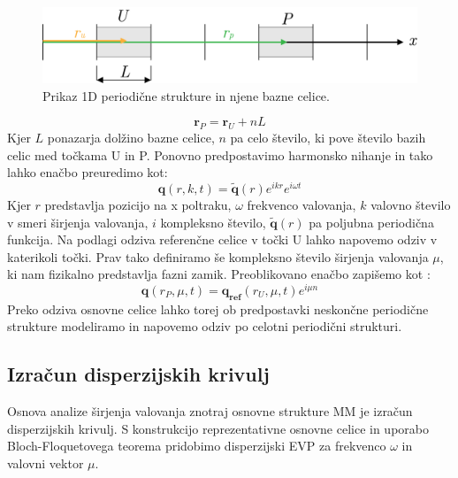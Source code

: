 \documentclass[12pt]{report}
\begin{document}
\begin{figure}[H]
  \centering
  \includegraphics{Images/bloch.png}
  \caption{Prikaz 1D periodične strukture in njene bazne celice.}
\end{figure}
\begin{equation}
  \mathbf{r}_P = \mathbf{r}_U + nL
\end{equation}
Kjer $L$ ponazarja dolžino bazne celice, $n$ pa celo število, ki pove število bazih celic med točkama U in P. Ponovno predpostavimo harmonsko
nihanje in tako lahko enačbo preuredimo kot:
\begin{equation}
  \mathbf{q}(r, k, t)  = \widetilde{\mathbf{q}}(r)e^{ik r}e^{i\omega t}
\end{equation}
Kjer $r$ predstavlja pozicijo na x poltraku, $\omega$ frekvenco valovanja, $k$ valovno število v smeri širjenja valovanja, $i$ kompleksno število, $\widetilde{\mathbf{q}}(r)$ pa poljubna periodična funkcija. Na podlagi odziva referenčne celice
v točki U lahko napovemo odziv v katerikoli točki. Prav tako definiramo še kompleksno število širjenja valovanja $\mu$, ki nam fizikalno predstavlja fazni zamik. Preoblikovano enačbo zapišemo
kot \cite{kosir}:
\begin{equation}
  \mathbf{q}(r_P, \mu, t)  = \mathbf{q_{ref}}(r_U, \mu,t)e^{i\mu n}
\end{equation} 
Preko odziva osnovne celice lahko torej ob predpostavki neskončne periodične strukture modeliramo in napovemo odziv po celotni
periodični strukturi.

\subsection{Izračun disperzijskih krivulj}
Osnova analize širjenja valovanja znotraj osnovne strukture \ac{MM} je izračun disperzijskih krivulj. S konstrukcijo reprezentativne
osnovne celice in uporabo Bloch-Floquetovega teorema pridobimo disperzijski \ac{EVP} za frekvenco $\omega$ in valovni vektor $\mu$. \cite{vanbelle}
\end{document}
